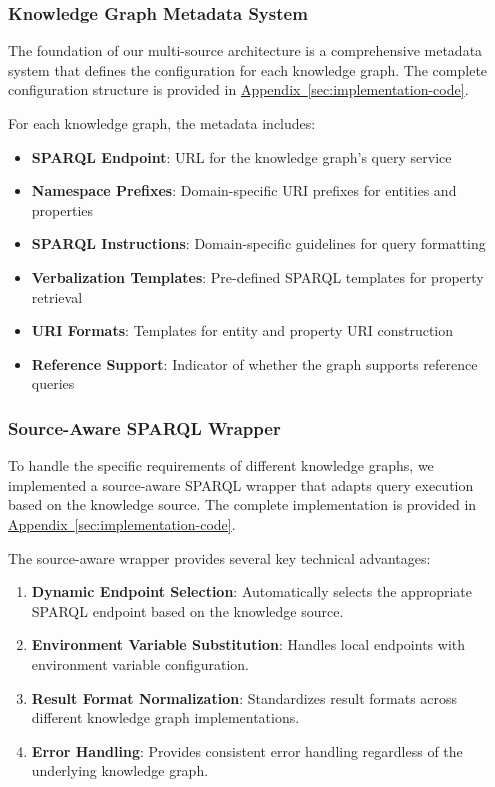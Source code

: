 \subsubsection{Knowledge Graph Metadata System}
The foundation of our multi-source architecture is a comprehensive metadata system that defines the configuration for each knowledge graph. The complete configuration structure is provided in \hyperref[code:kg-metadata]{Appendix~\ref{sec:implementation-code}}.

For each knowledge graph, the metadata includes:
\begin{itemize}
    \item \textbf{SPARQL Endpoint}: URL for the knowledge graph's query service
    \item \textbf{Namespace Prefixes}: Domain-specific URI prefixes for entities and properties
    \item \textbf{SPARQL Instructions}: Domain-specific guidelines for query formatting
    \item \textbf{Verbalization Templates}: Pre-defined SPARQL templates for property retrieval
    \item \textbf{URI Formats}: Templates for entity and property URI construction
    \item \textbf{Reference Support}: Indicator of whether the graph supports reference queries
\end{itemize}

\subsubsection{Source-Aware SPARQL Wrapper}
To handle the specific requirements of different knowledge graphs, we implemented a source-aware SPARQL wrapper that adapts query execution based on the knowledge source. The complete implementation is provided in \hyperref[code:source-aware-sparql]{Appendix~\ref{sec:implementation-code}}.

The source-aware wrapper provides several key technical advantages:

\begin{enumerate}
    \item \textbf{Dynamic Endpoint Selection}: Automatically selects the appropriate SPARQL endpoint based on the knowledge source.
    \item \textbf{Environment Variable Substitution}: Handles local endpoints with environment variable configuration.
    \item \textbf{Result Format Normalization}: Standardizes result formats across different knowledge graph implementations.
    \item \textbf{Error Handling}: Provides consistent error handling regardless of the underlying knowledge graph.
\end{enumerate}

